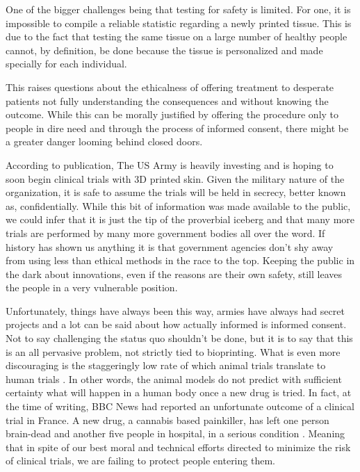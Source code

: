 \documentclass[12pt]{article} %
\begin{document}
One of the bigger challenges being that testing for safety is limited. For one, it is impossible to compile a reliable statistic regarding a newly printed tissue. This is due to the fact that testing the same tissue on a large number of healthy people cannot, by definition, be done because the tissue is personalized and made specially for each individual.

This raises questions about the ethicalness of offering treatment to desperate patients not fully understanding the consequences and without knowing the outcome. While this can be morally justified by offering the procedure only to people in dire need and through the process of informed consent, there might be a greater danger looming behind closed doors. 

According to \cite{Army Technology:2014} publication, The US Army is heavily investing and is hoping to soon begin clinical trials with 3D printed skin. Given the military nature of the organization, it is safe to assume the trials will be held in secrecy, better known as, confidentially. While this bit of information was made available to the public, we could infer that it is just the tip of the proverbial iceberg and that many more trials are performed by many more government bodies all over the word. If history has shown us anything it is that government agencies don't shy away from using less than ethical methods in the race to the top. Keeping the public in the dark about innovations, even if the reasons are their own safety, still leaves the people in a very vulnerable position.

Unfortunately, things have always been this way, armies have always had secret projects and a lot can be said about how actually informed is informed consent. Not to say challenging the status quo shouldn't be done, but it is to say that this is an all pervasive problem, not strictly tied to bioprinting. What is even more discouraging is the staggeringly low rate of which animal trials translate to human trials \cite{Worp:2010}. In other words, the animal models do not predict with sufficient certainty what will happen in a human body once a new drug is tried. In fact, at the time of writing, BBC News had reported an unfortunate outcome of a clinical trial in France. A new drug, a cannabis based painkiller, has left one person brain-dead and another five people in hospital, in a serious condition \cite{BBC News:2016}. Meaning that in spite of our best moral and technical efforts directed to minimize the risk of clinical trials, we are failing to protect people entering them.
\end{document}
